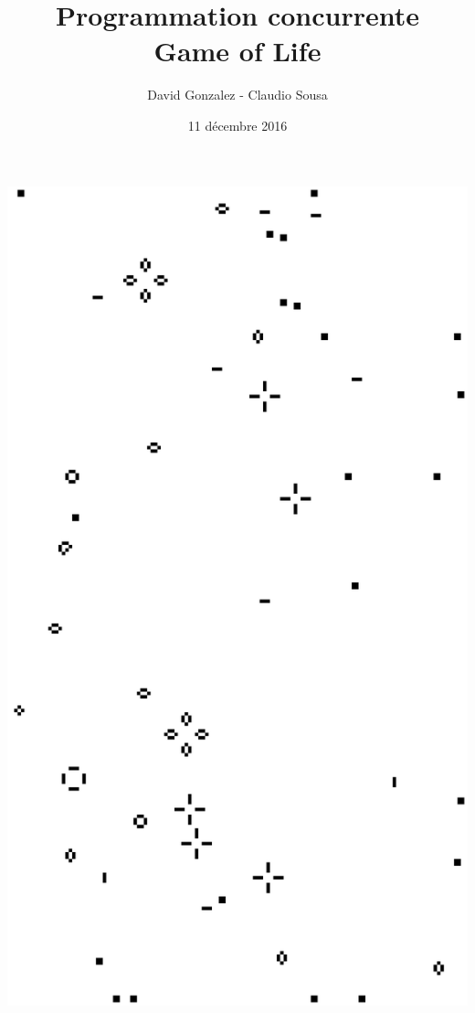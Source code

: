 \documentclass[11pt, a4paper]{article}
\begin{document}
\title
{
    \Huge{Programmation concurrente} \\
    \Huge{Game of Life}
}
\author
{
    \LARGE{David Gonzalez - Claudio Sousa}
}
\date{11 décembre 2016}
\maketitle

\begin{center}
    \includegraphics[scale=0.27]{logo.png}
\end{center}
\end{document}
